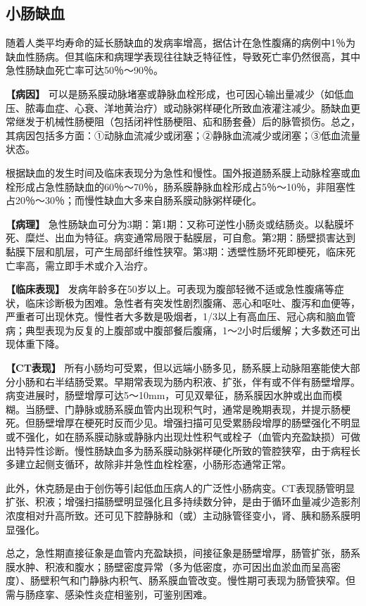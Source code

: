 \subsection{小肠缺血}

随着人类平均寿命的延长肠缺血的发病率增高，据估计在急性腹痛的病例中1％为缺血性肠病。但其临床和病理学表现往往缺乏特征性，导致死亡率仍然很高，其中急性肠缺血死亡率可达50％～90％。

\textbf{【病因】}
可以是肠系膜动脉堵塞或静脉血栓形成，也可因心输出量减少（如低血压、脓毒血症、心衰、洋地黄治疗）或动脉粥样硬化所致血液灌注减少。肠缺血更常继发于机械性肠梗阻（包括闭袢性肠梗阻、疝和肠套叠）后的脉管损伤。总之，其病因包括多方面：①动脉血流减少或闭塞；②静脉血流减少或闭塞；③低血流量状态。

根据缺血的发生时间及临床表现分为急性和慢性。国外报道肠系膜上动脉栓塞或血栓形成占急性肠缺血的60％～70％，肠系膜静脉血栓形成占5％～10％，非阻塞性占20％～30％；而慢性缺血大多来自肠系膜动脉粥样硬化。

\textbf{【病理】}
急性肠缺血可分为3期：第1期：又称可逆性小肠炎或结肠炎。以黏膜坏死、糜烂、出血为特征。病变通常局限于黏膜层，可自愈。第2期：肠壁损害达到黏膜下层和肌层，可产生局部纤维性狭窄。第3期：透壁性肠坏死即梗死，临床死亡率高，需立即手术或介入治疗。

\textbf{【临床表现】}
发病年龄多在50岁以上。可表现为腹部轻微不适或急性腹痛等症状，临床诊断极为困难。急性者有突发性剧烈腹痛、恶心和呕吐、腹泻和血便等，严重者可出现休克。慢性者大多数是吸烟者，1/3以上有高血压、冠心病和脑血管病；典型表现为反复的上腹部或中腹部餐后腹痛，1～2小时后缓解；大多数还可出现体重下降。

\textbf{【CT表现】}
所有小肠均可受累，但以远端小肠多见，肠系膜上动脉阻塞能使大部分小肠和右半结肠受累。早期常表现为肠内积液、扩张，伴有或不伴有肠壁增厚。病变进展时，肠壁增厚可达5～10mm，可见双晕征，肠系膜因水肿或出血而模糊。当肠壁、门静脉或肠系膜血管内出现积气时，通常是晚期表现，并提示肠梗死。但肠壁增厚在梗死时反而少见。增强扫描可见受累肠段增厚的肠壁强化不明显或不强化，如在肠系膜动脉或静脉内出现灶性积气或栓子（血管内充盈缺损）可做出特异性诊断。慢性肠缺血多为肠系膜动脉粥样硬化所致的管腔狭窄，由于病程长多建立起侧支循环，故除非并急性血栓栓塞，小肠形态通常正常。

此外，休克肠是由于创伤等引起低血压病人的广泛性小肠病变。CT表现肠管明显扩张、积液；增强扫描肠壁明显强化且多持续数分钟，是由于循环血量减少造影剂浓度相对升高所致。还可见下腔静脉和（或）主动脉管径变小，肾、胰和肠系膜明显强化。

总之，急性期直接征象是血管内充盈缺损，间接征象是肠壁增厚，肠管扩张，肠系膜水肿、积液和腹水；肠壁密度异常（多为低密度，亦可因出血淤血而呈高密度）、肠壁积气和门静脉内积气、肠系膜血管改变。慢性期可表现为肠管狭窄。但需与肠痉挛、感染性炎症相鉴别，可鉴别困难。

